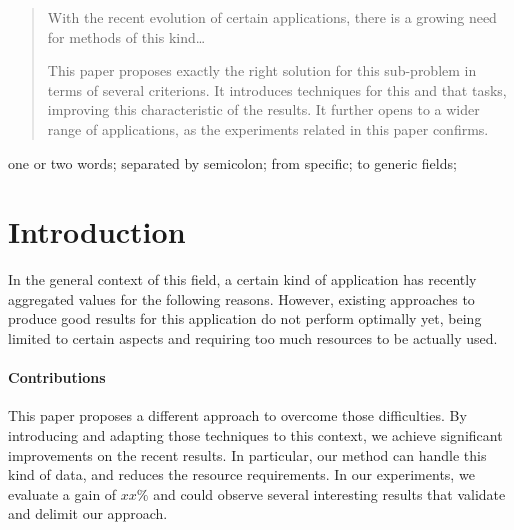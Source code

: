 \documentclass[10pt, conference]{IEEEtran}
\begin{document}
\maketitle


\begin{abstract}
With the recent evolution of certain applications, there is a growing need for methods of this kind\ldots{}

This paper proposes exactly the right solution for this sub-problem in terms of several criterions. It introduces techniques for this and that tasks, improving this characteristic of the results. It further opens to a wider range of applications, as the experiments related in this paper confirms.

%
\end{abstract}

\begin{IEEEkeywords}
one or two words; separated by semicolon; from specific; to generic fields;

\end{IEEEkeywords}


\IEEEpeerreviewmaketitle





\section{Introduction}
%
In the general context of this field, a certain kind of application has recently aggregated values for the following reasons.
%
However, existing approaches to produce good results for this application do not perform optimally yet, being limited to certain aspects and requiring too much resources to be actually used.


\paragraph*{Contributions}
%
This paper proposes a different approach to overcome those difficulties. By introducing and adapting those techniques to this context, we achieve significant improvements on the recent results. In particular, our method can handle this kind of data, and reduces the resource requirements. In our experiments, we evaluate a gain of $xx\%$ and could observe several interesting results that validate and delimit our approach.
\end{document}

